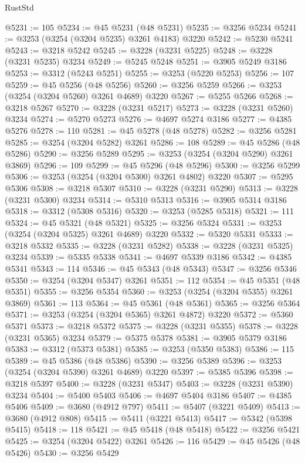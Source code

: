 \begin{lexlean}{RustStd}
\begin{coremodule}
@5231 := 105
@5234 := @45 @5231 (@48 @5231)
@5235 := @3256 @5234
@5241 := @3253 (@3254 (@3204 @5235) @3261 @4183) @3220
@5242 := @5230 @5241
@5243 := @3218 @5242
@5245 := @3228 (@3231 @5225)
@5248 := @3228 (@3231 @5235) @3234
@5249 := @5245 @5248
@5251 := @3905 @5249 @3186
@5253 := @3312 (@5243 @5251)
@5255 := @3253 (@5220 @5253)
@5256 := 107
@5259 := @45 @5256 (@48 @5256)
@5260 := @3256 @5259
@5266 := @3253 (@3254 (@3204 @5260) @3261 @4689) @3220
@5267 := @5255 @5266
@5268 := @3218 @5267
@5270 := @3228 (@3231 @5217)
@5273 := @3228 (@3231 @5260) @3234
@5274 := @5270 @5273
@5276 := @4697 @5274 @3186
@5277 := @4385 @5276
@5278 := 110
@5281 := @45 @5278 (@48 @5278)
@5282 := @3256 @5281
@5285 := @3254 (@3204 @5282) @3261
@5286 := 108
@5289 := @45 @5286 (@48 @5286)
@5290 := @3256 @5289
@5295 := @3253 (@3254 (@3204 @5290) @3261 @3869)
@5296 := 109
@5299 := @45 @5296 (@48 @5296)
@5300 := @3256 @5299
@5306 := @3253 (@3254 (@3204 @5300) @3261 @4802) @3220
@5307 := @5295 @5306
@5308 := @3218 @5307
@5310 := @3228 (@3231 @5290)
@5313 := @3228 (@3231 @5300) @3234
@5314 := @5310 @5313
@5316 := @3905 @5314 @3186
@5318 := @3312 (@5308 @5316)
@5320 := @3253 (@5285 @5318)
@5321 := 111
@5324 := @45 @5321 (@48 @5321)
@5325 := @3256 @5324
@5331 := @3253 (@3254 (@3204 @5325) @3261 @4689) @3220
@5332 := @5320 @5331
@5333 := @3218 @5332
@5335 := @3228 (@3231 @5282)
@5338 := @3228 (@3231 @5325) @3234
@5339 := @5335 @5338
@5341 := @4697 @5339 @3186
@5342 := @4385 @5341
@5343 := 114
@5346 := @45 @5343 (@48 @5343)
@5347 := @3256 @5346
@5350 := @3254 (@3204 @5347) @3261
@5351 := 112
@5354 := @45 @5351 (@48 @5351)
@5355 := @3256 @5354
@5360 := @3253 (@3254 (@3204 @5355) @3261 @3869)
@5361 := 113
@5364 := @45 @5361 (@48 @5361)
@5365 := @3256 @5364
@5371 := @3253 (@3254 (@3204 @5365) @3261 @4872) @3220
@5372 := @5360 @5371
@5373 := @3218 @5372
@5375 := @3228 (@3231 @5355)
@5378 := @3228 (@3231 @5365) @3234
@5379 := @5375 @5378
@5381 := @3905 @5379 @3186
@5383 := @3312 (@5373 @5381)
@5385 := @3253 (@5350 @5383)
@5386 := 115
@5389 := @45 @5386 (@48 @5386)
@5390 := @3256 @5389
@5396 := @3253 (@3254 (@3204 @5390) @3261 @4689) @3220
@5397 := @5385 @5396
@5398 := @3218 @5397
@5400 := @3228 (@3231 @5347)
@5403 := @3228 (@3231 @5390) @3234
@5404 := @5400 @5403
@5406 := @4697 @5404 @3186
@5407 := @4385 @5406
@5409 := @3680 (@4912 @797)
@5411 := @5407 (@3221 @5409)
@5413 := @3680 (@4912 @808)
@5415 := @5411 (@3221 @5413)
@5417 := @5342 (@5398 @5415)
@5418 := 118
@5421 := @45 @5418 (@48 @5418)
@5422 := @3256 @5421
@5425 := @3254 (@3204 @5422) @3261
@5426 := 116
@5429 := @45 @5426 (@48 @5426)
@5430 := @3256 @5429

\end{coremodule}
\end{lexlean}
